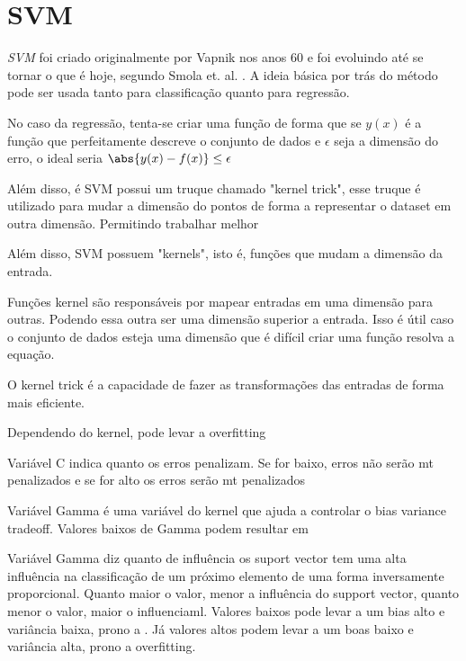 
\section{\acrfull{SVM}}

\textit{\acrshort{SVM}} foi criado originalmente por Vapnik nos anos 60 e foi evoluindo até se tornar o que é hoje, segundo Smola et. al. \cite{Smola03atutorial}. A ideia básica por trás do método pode ser usada tanto para classificação quanto para regressão. 

No caso da regressão, tenta-se criar uma função  de forma que se \(y(x)\) é a função que perfeitamente descreve o conjunto de dados e \(\epsilon\) seja a dimensão do erro, o ideal seria \(\abs{y(x) - f(x)} \leq \epsilon \)

Além disso, é SVM possui um truque chamado "kernel trick", esse truque é utilizado para mudar a dimensão do pontos de forma a representar o dataset em outra dimensão. Permitindo trabalhar melhor

Além disso, SVM possuem "kernels", isto é, funções que mudam a dimensão da entrada. 

Funções kernel são responsáveis por mapear entradas em uma dimensão para outras. Podendo essa outra ser uma dimensão superior a entrada. Isso é útil caso o conjunto de dados esteja uma dimensão que é difícil criar uma função resolva a equação.

O kernel trick é a capacidade de fazer as transformações das entradas de forma mais eficiente.

Dependendo do kernel, pode levar a overfitting

Variável C indica quanto os erros penalizam. Se for baixo, erros não serão mt penalizados e se for alto os erros serão mt penalizados

Variável Gamma é uma variável do kernel que ajuda a controlar o bias variance tradeoff. Valores baixos de Gamma podem resultar em

Variável Gamma diz quanto de influência os suport vector tem uma alta influência na classificação de um próximo elemento de uma forma inversamente proporcional. Quanto maior o valor, menor a influência do support vector, quanto menor o valor, maior o influenciaml. Valores baixos pode levar a um bias alto e variância baixa, prono a . Já valores altos podem levar a um boas baixo e variância alta, prono a overfitting.

